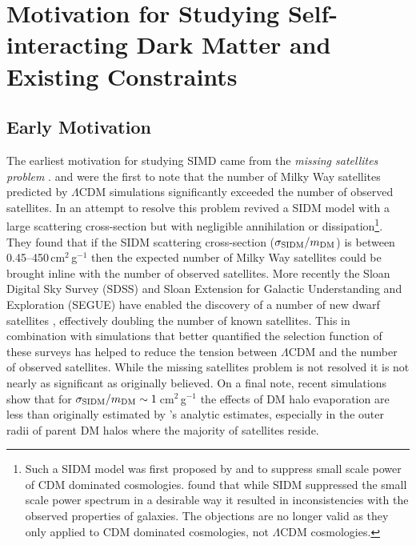 \section{Motivation for Studying Self-interacting Dark Matter and Existing Constraints}\label{section:SIDMmotivation}

\subsection{Early Motivation}

The earliest motivation for studying SIMD came from the \textit{missing satellites problem} \citep[see][for a thorough review]{Bullock:2010uv}.
\citet{Moore:1999ja} and \citet{Klypin:1999ej} were the first to note that the number of Milky Way satellites predicted by $\Lambda$CDM simulations significantly exceeded the number of observed satellites.
In an attempt to resolve this problem \citet{Spergel:2000cb} revived a SIDM model with a large scattering cross-section but with negligible annihilation or dissipation\footnote{Such a SIDM model was first proposed by \citet{Carlson:1992cp} and \citet{Machacek:1994kj} to suppress small scale power of CDM dominated cosmologies.  \citet{deLaix:1995ey} found that while SIDM suppressed the small scale power spectrum in a desirable way it resulted in inconsistencies with the observed properties of galaxies.  The \citet{deLaix:1995ey} objections are no longer valid as they only applied to CDM dominated cosmologies, not $\Lambda$CDM cosmologies.}. 
They found that if the SIDM scattering cross-section ($\sigma_{\rm SIDM}/m_{\rm DM}$) is between 0.45--450\,cm$^2$\,g$^{-1}$ then the expected number of Milky Way satellites could be brought inline with the number of observed satellites.
More recently the Sloan Digital Sky Survey (SDSS) and Sloan Extension for Galactic Understanding and Exploration (SEGUE) have enabled the discovery of a number of new dwarf satellites \citep[see][for a review]{Willman:2010fg}, effectively doubling the number of known satellites.
This in combination with simulations that better quantified the selection function of these surveys has helped to reduce the tension between $\Lambda$CDM and the number of observed satellites.
While the missing satellites problem is not resolved it is not nearly as significant as originally believed.
On a final note, recent simulations \citep{Rocha:2012tr} show that for $\sigma_{\rm SIDM}/m_{\rm DM} \sim 1$\,cm$^2$\,g$^{-1}$ the effects of DM halo evaporation are less than originally estimated by \citet{Spergel:2000cb}'s analytic estimates, especially in the outer radii of parent DM halos where the majority of satellites reside.

